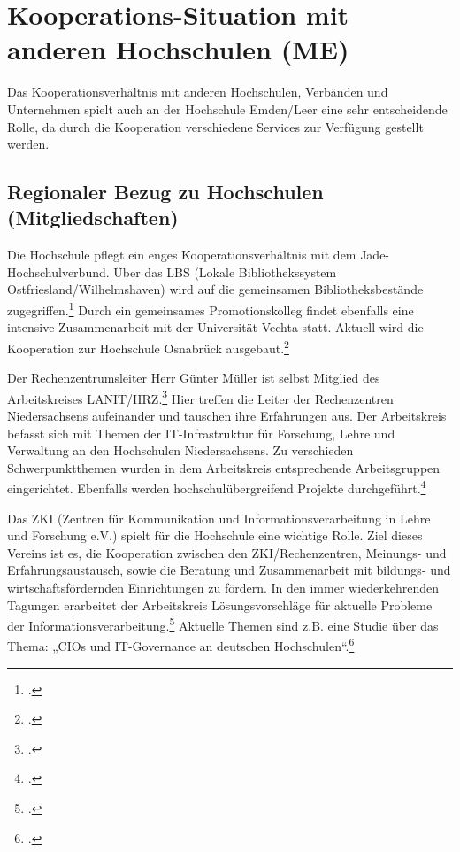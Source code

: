 \section{Kooperations-Situation mit anderen Hochschulen (ME)}
\label{section_kooperations_situation}

Das Kooperationsverhältnis mit anderen Hochschulen, Verbänden und Unternehmen spielt auch an der Hochschule Emden/Leer eine sehr entscheidende Rolle, da durch die Kooperation verschiedene Services zur Verfügung gestellt werden.

\subsection{Regionaler Bezug zu Hochschulen (Mitgliedschaften)}
Die Hochschule pflegt ein enges Kooperationsverhältnis mit dem Jade-Hochschulverbund. Über das LBS (Lokale Bibliothekssystem Ostfriesland/Wilhelmshaven) wird auf die gemeinsamen  Bibliotheksbestände zugegriffen.\footcite{jadehs_online_kataloge_2015} Durch ein gemeinsames Promotionskolleg findet ebenfalls eine intensive Zusammenarbeit mit der Universität Vechta statt. Aktuell wird die Kooperation zur Hochschule Osnabrück ausgebaut.\footcite[Vgl.][]{hsel_profil_2015}

Der Rechenzentrumsleiter Herr Günter Müller ist selbst Mitglied des Arbeitskreises LANIT/HRZ.\footcite[Vgl.][]{lanit_mitglieder_2011} Hier treffen die Leiter der Rechenzentren Niedersachsens aufeinander und tauschen ihre Erfahrungen aus. Der Arbeitskreis befasst sich mit Themen der IT-Infrastruktur für Forschung, Lehre und Verwaltung an den Hochschulen Niedersachsens. Zu verschieden Schwerpunktthemen wurden in dem Arbeitskreis entsprechende Arbeitsgruppen eingerichtet.  Ebenfalls werden hochschulübergreifend Projekte durchgeführt.\footcite[Vgl.][]{lanit_home_2014}

Das ZKI (Zentren für Kommunikation und Informationsverarbeitung in Lehre und Forschung e.V.) spielt für die Hochschule eine wichtige Rolle. Ziel dieses Vereins ist es, die Kooperation zwischen den ZKI/Rechenzentren, Meinungs- und Erfahrungsaustausch, sowie die Beratung und Zusammenarbeit mit bildungs- und wirtschaftsfördernden Einrichtungen zu fördern. In den immer wiederkehrenden Tagungen erarbeitet der Arbeitskreis Lösungsvorschläge für aktuelle Probleme der Informationsverarbeitung.\footcite[Vgl.][]{zki_verein_2015} Aktuelle Themen sind z.B. eine Studie über das Thema: „CIOs und IT-Governance an deutschen Hochschulen“.\footcite{zki_beitrag_CIOs_2014}

